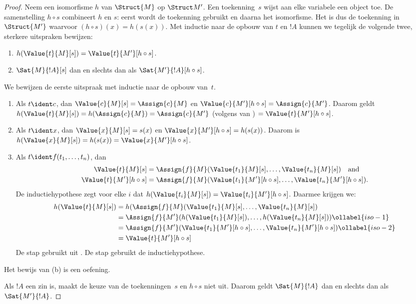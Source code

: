 \documentclass[openany]{memoir}
\begin{document}
\begin{proof}
Neem een isomorfisme $h$ van $\Struct{M}$ op $\Struct M'$. Een
toekenning~$s$ wijst aan elke variabele een object toe.
De samenstelling $h \circ s$ combineert $h$ en $s$: eerst wordt de
toekenning gebruikt en daarna het isomorfisme. Het is dus de toekenning
in $\Struct{M'}$ waarvoor
$(h \circ s)(x) = h(s(x))$. Met inductie naar de opbouw van $t$ en $!A$
kunnen we tegelijk de volgende twee, sterkere uitspraken bewijzen:
\begin{enumerate}
  \item[a.] $h(\Value{t}{M}[s]) = \Value{t}{M'}[h\circ s]$.
  \item[b.] $\Sat{M}{!A}[s]$ dan en slechts dan als $\Sat{M'}{!A}[h \circ s]$.
\end{enumerate}
We bewijzen de eerste uitspraak met inductie naar de opbouw van~$t$.
\begin{enumerate}
\item Als $t \ident c$, dan $\Value{c}{M}[s] = \Assign{c}{M}$ en
  $\Value{c}{M'}[h \circ s] = \Assign{c}{M'}$. Daarom geldt
  $h(\Value{t}{M}[s]) = h(\Assign{c}{M}) = \Assign{c}{M'}$ (volgens
   van ) $=
  \Value{t}{M'}[h \circ s]$.
\item Als $t \ident x$, dan $\Value{x}{M}[s] = s(x)$ en
  $\Value{x}{M'}[h \circ s] = h(s(x))$. Daarom is $h(\Value{x}{M}[s]) =
  h(s(x)) = \Value{x}{M'}[h \circ s]$.
\item Als $t \ident f(t_1, \dots, t_n)$, dan
  \begin{align*}
    \Value{t}{M}[s] & = \Assign{f}{M}(\Value{t_1}{M}[s], \dots, \Value{t_n}{M}[s]) \quad\text{and}\\
  \Value{t}{M'}[h \circ s] & = \Assign{f}{M}(\Value{t_1}{M'}[h \circ
    s], \dots, \Value{t_n}{M'}[h \circ s]).
  \end{align*}
  De inductiehypothese zegt voor elke $i$ dat
  $h(\Value{t_i}{M}[s]) = \Value{t_i}{M'}[h\circ s]$. Daarmee krijgen
  we:
  \begin{align}
    h(\Value{t}{M}[s]) 
    & = h(\Assign{f}{M}(\Value{t_1}{M}[s], \dots, \Value{t_n}{M}[s]) \notag\\
    & = \Assign{f}{M'}(h(\Value{t_1}{M}[s]), \dots,
    h(\Value{t_n}{M}[s])) \ollabel{iso-1}\\
    & = \Assign{f}{M'}(\Value{t_1}{M'}[h \circ s], \dots,
    \Value{t_n}{M'}[h \circ s]) \ollabel{iso-2}\\
    & = \Value{t}{M'}[h\circ s] \notag
  \end{align}
  De stap  gebruikt  uit
  . De stap  gebruikt de
  inductiehypothese.
\end{enumerate}
Het bewijs van (b) is een oefening.

Als $!A$ een zin is, maakt de keuze van de toekenningen~$s$ en
$h \circ s$ niet uit. Daarom geldt $\Sat{M}{!A}$ dan en slechts dan als
$\Sat{M'}{!A}$.
\end{proof}
\end{document}
